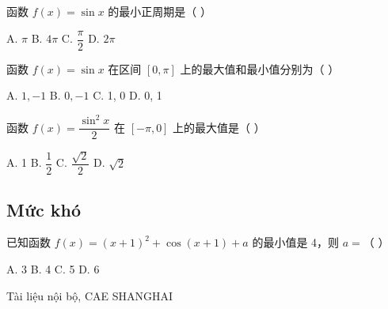 \documentclass[11pt, a4paper]{article}
\begin{document}
\begin{baitap}[7]
函数 $f(x) = \sin x$ 的最小正周期是（ ）
\par\vspace{3pt}
\noindent A. $\pi$ \quad B. $4\pi$ \quad C. $\dfrac{\pi}{2}$ \quad D. $2\pi$
\end{baitap}
\begin{baitap}[8]
函数 $f(x) = \sin x$ 在区间 $[0, \pi]$ 上的最大值和最小值分别为（ ）
\par\vspace{3pt}
\noindent A. $1, -1$ \quad B. $0, -1$ \quad C. 1, 0 \quad D. 0, 1
\end{baitap}
\begin{baitap}[9]
函数 $f(x) = \dfrac{\sin^2 x}{2}$ 在 $[-\pi, 0]$ 上的最大值是（ ）
\par\vspace{3pt}
\noindent A. 1 \quad B. $\dfrac{1}{2}$ \quad C. $\dfrac{\sqrt{2}}{2}$ \quad D. $\sqrt{2}$
\end{baitap}
\subsection{Mức khó}

\begin{baitap}[10]
已知函数 $f(x) = (x+1)^2 + \cos(x+1) + a$ 的最小值是 4，则 $a =$（ ）
\par\vspace{3pt}
\noindent A. 3 \quad B. 4 \quad C. 5 \quad D. 6
\end{baitap}
\vspace{0.8cm}
\begin{center}
{\footnotesize\color{cae_blue} Tài liệu nội bộ, CAE SHANGHAI}
\end{center}
\end{document}
